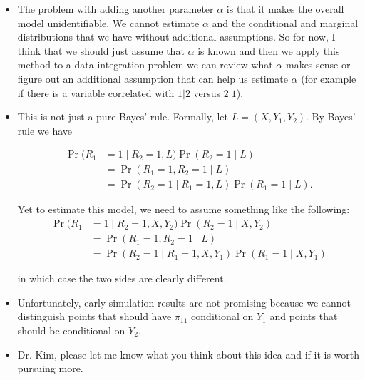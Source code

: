 \documentclass[12pt]{article}
\begin{document}
\begin{itemize}
  \item The problem with adding another parameter $\alpha$ is that it makes the
    overall model unidentifiable. We cannot estimate $\alpha$ and the
    conditional and marginal distributions that we have without additional
    assumptions. So for now, I think that we should just assume that $\alpha$ is
    known and then we apply this method to a data integration problem we can
    review what $\alpha$ makes sense or figure out an additional assumption that
    can help us estimate $\alpha$ (for example if there is a variable correlated
    with $1|2$ versus $2|1$).

  \item This is not just a pure Bayes' rule.
    Formally, let $L = (X, Y_1, Y_2)$. By Bayes' rule we have

    \begin{align*}
      \Pr(R_1 &= 1 \mid R_2 = 1, L) \Pr(R_2 = 1 \mid L) \\
      &= \Pr(R_1 = 1, R_2 = 1 \mid L) \\
      & = \Pr(R_2 = 1 \mid R_1 = 1, L) \Pr(R_1 = 1 \mid L).
    \end{align*}

    Yet to estimate this model, we need to assume something like the following:
    \begin{align*}
      \Pr(R_1 &= 1 \mid R_2 = 1, X, Y_2) \Pr(R_2 = 1 \mid X, Y_2)\\
      &= \Pr(R_1 = 1, R_2 = 1 \mid L) \\
      &= \Pr(R_2 = 1 \mid R_1 = 1, X, Y_1) \Pr(R_1 = 1 \mid X, Y_1)
    \end{align*}

    in which case the two sides are clearly different.

    \item Unfortunately, early simulation results are not promising because we
      cannot distinguish points that should have $\pi_{11}$ conditional on $Y_1$
      and points that should be conditional on $Y_2$.

      

    \item Dr. Kim, please let me know what you think about this idea and if it
      is worth pursuing more.

\end{itemize}

\newpage

\printbibliography
\end{document}
